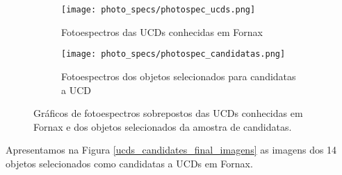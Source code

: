 \begin{figure}[!ht]
    \centering
    \captionsetup{justification=centering}
    \begin{subfigure}[b]{0.95\textwidth}
        \texttt{[image: photo\_specs/photospec\_ucds.png]}
        \caption{Fotoespectros das UCDs conhecidas em Fornax}
    \end{subfigure}
    \begin{subfigure}[b]{0.95\textwidth}
        \texttt{[image: photo\_specs/photospec\_candidatas.png]}
        \caption{Fotoespectros dos objetos selecionados para candidatas a UCD}
    \end{subfigure}
    \caption{Gráficos de fotoespectros sobrepostos das UCDs conhecidas em Fornax e dos objetos selecionados da amostra de candidatas.}
    \label{ucds_and_candiadates_star_cut_photospec}
\end{figure}


Apresentamos na Figura \ref{ucds_candidates_final_imagens} as imagens dos 14 objetos selecionados como candidatas a UCDs em Fornax.

